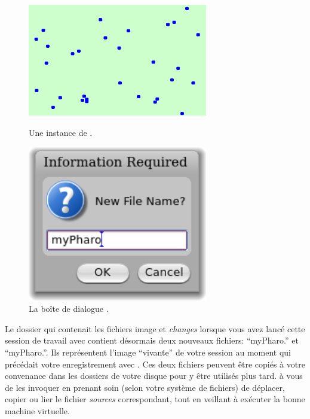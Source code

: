 \documentclass[a4paper,10pt,twoside]{book}
\begin{document}

\begin{figure}[htb]
\begin{minipage}[b]{0.48\textwidth}
	{\centerline{\includegraphics[width=0.7\textwidth]{atoms}}}
	\caption{Une instance de \bam.}
\end{minipage}
\hfill
\begin{minipage}[b]{0.48\textwidth}
	{\centerline{\includegraphics[width=0.7\textwidth]{saveAs}}}
	\caption{La boîte de dialogue .}
\end{minipage}
\end{figure}


Le dossier qui contenait les fichiers image et \emph{changes} lorsque
vous avez lancé cette session de travail avec \pharo contient désormais
deux nouveaux fichiers: ``myPharo.'' et ``myPharo.''. 
Ils représentent l'image ``vivante'' de votre session \pharo au moment qui précédait votre enregistrement avec .
Ces deux fichiers peuvent être copiés à votre convenance dans les
dossiers  de votre disque pour y être utilisés plus tard. à vous de
les invoquer en prenant soin (selon votre système de fichiers) de
déplacer, copier ou lier le fichier \emph{sources} correspondant,
tout en veillant à exécuter la bonne machine virtuelle.
\end{document}
